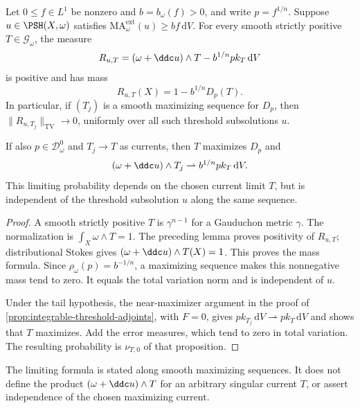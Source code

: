 \begin{proposition}\label{prop:threshold-trace-saturation}
Let $0\leq f\in L^1$ be nonzero and $b=b_\omega(f)>0$, and write $p=f^{1/n}$. Suppose $u\in\PSH(X,\omega)$ satisfies $\mathrm{MA}^{\mathrm{ext}}_\omega(u)\geq bf\,\mathrm{d}V$. For every smooth strictly positive $T\in\mathscr G_\omega$, the measure
\[
 R_{u,T}=(\omega+\ddc u)\wedge T-b^{1/n}p k_T\,\mathrm{d}V
\]
is positive and has mass
\[
 R_{u,T}(X)=1-b^{1/n}D_p(T).
\]
In particular, if $(T_j)$ is a smooth maximizing sequence for $D_p$, then $\|R_{u,T_j}\|_{\mathrm{TV}}\to0$, uniformly over all such threshold subsolutions $u$.

If also $p\in\mathcal D_\omega^0$ and $T_j\to T$ as currents, then $T$ maximizes $D_p$ and
\[
 (\omega+\ddc u)\wedge T_j
       \rightharpoonup b^{1/n}p k_T\,\mathrm{d}V.
\]
This limiting probability depends on the chosen current limit $T$, but is independent of the threshold subsolution $u$ along the same sequence.
\end{proposition}
\begin{proof}
A smooth strictly positive $T$ is $\gamma^{n-1}$ for a Gauduchon metric $\gamma$. The normalization is $\int_X\omega\wedge T=1$. The preceding lemma proves positivity of $R_{u,T}$; distributional Stokes gives $(\omega+\ddc u)\wedge T(X)=1$. This proves the mass formula. Since $\rho_\omega(p)=b^{-1/n}$, a maximizing sequence makes this nonnegative mass tend to zero. It equals the total variation norm and is independent of $u$.

Under the tail hypothesis, the near-maximizer argument in the proof of \cref{prop:integrable-threshold-adjoints}, with $F=0$, gives
$p k_{T_j}\,\mathrm{d}V\rightharpoonup p k_T\,\mathrm{d}V$ and shows that $T$ maximizes. Add the error measures, which tend to zero in total variation. The resulting probability is $\nu_{T,0}$ of that proposition.
\end{proof}

The limiting formula is stated along smooth maximizing sequences. It does not define the product $(\omega+\ddc u)\wedge T$ for an arbitrary singular current $T$, or assert independence of the chosen maximizing current.

